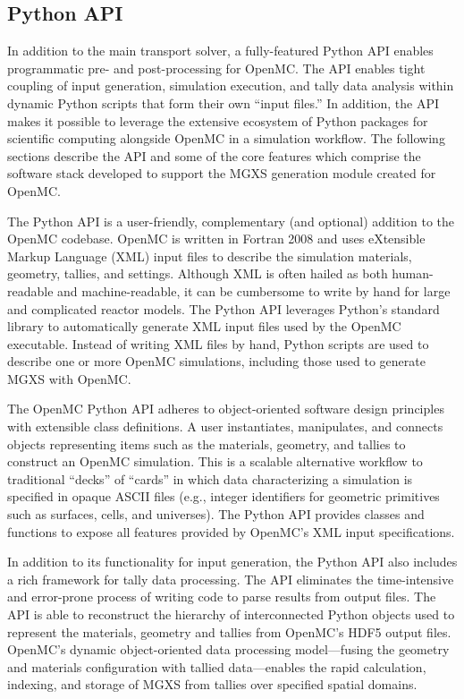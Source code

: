 \subsection{Python API}
\label{subsec:pyapi}

In addition to the main transport solver, a fully-featured Python API enables programmatic pre- and post-processing for OpenMC\cite{boyd2016bigdata}. The API enables tight coupling of input generation, simulation execution, and tally data analysis within dynamic Python scripts that form their own ``input files.'' In addition, the API makes it possible to leverage the extensive ecosystem of Python packages for scientific computing alongside OpenMC in a simulation workflow. The following sections describe the API and some of the core features which comprise the software stack developed to support the MGXS generation module created for OpenMC.

The Python API is a user-friendly, complementary (and optional) addition to the OpenMC codebase. OpenMC is written in Fortran 2008 and uses eXtensible Markup Language (XML) input files to describe the simulation materials, geometry, tallies, and settings. Although XML is often hailed as both human-readable and machine-readable, it can be cumbersome to write by hand for large and complicated reactor models. The Python API leverages Python's standard library to automatically generate XML input files used by the OpenMC executable. Instead of writing XML files by hand, Python scripts are used to describe one or more OpenMC simulations, including those used to generate MGXS with OpenMC.

The OpenMC Python API adheres to object-oriented software design principles with extensible class definitions. A user instantiates, manipulates, and connects objects representing items such as the materials, geometry, and tallies to construct an OpenMC simulation. This is a scalable alternative workflow to traditional ``decks'' of ``cards'' in which data characterizing a simulation is specified in opaque ASCII files (e.g., integer identifiers for geometric primitives such as surfaces, cells, and universes). The Python API provides classes and functions to expose all features provided by OpenMC's XML input specifications.

In addition to its functionality for input generation, the Python API also includes a rich framework for tally data processing. The API eliminates the time-intensive and error-prone process of writing code to parse results from output files. The API is able to reconstruct the hierarchy of interconnected Python objects used to represent the materials, geometry and tallies from OpenMC's HDF5 output files. OpenMC's dynamic object-oriented data processing model---fusing the geometry and materials configuration with tallied data---enables the rapid calculation, indexing, and storage of MGXS from tallies over specified spatial domains.

